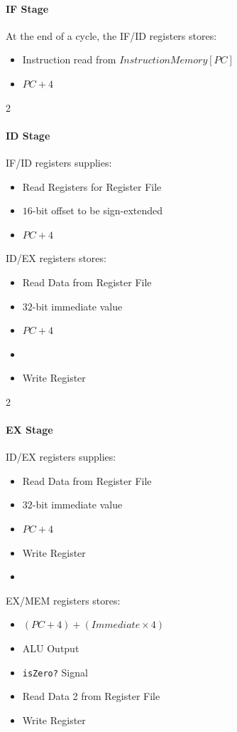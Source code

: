 \paragraph{IF Stage} At the end of a cycle, the IF/ID registers stores:
\begin{itemize}
  \item Instruction read from $InstructionMemory[PC]$
  \item $PC+4$
\end{itemize}

\begin{multicols}{2}
\paragraph{ID Stage} IF/ID registers supplies:
\begin{itemize}
  \item Read Registers for Register File
  \item $16$-bit offset to be sign-extended
  \item $PC+4$
\end{itemize}
ID/EX registers stores:
\begin{itemize}
  \item Read Data from Register File
  \item $32$-bit immediate value
  \item $PC+4$
\end{itemize}
\begin{itemize}
  \item[\vspace{\fill}]
\end{itemize}
\begin{itemize}
  \item Write Register
\end{itemize}
\end{multicols}

\begin{multicols}{2}
\paragraph{EX Stage} ID/EX registers supplies:
\begin{itemize}
  \item Read Data from Register File
  \item $32$-bit immediate value
  \item $PC+4$
  \item Write Register
  \item[\vspace{\fill}]
\end{itemize}
\columnbreak%
EX/MEM registers stores:
\begin{itemize}
  \item $\left( PC+4 \right) + \left( Immediate \times 4 \right) $
  \item ALU Output
  \item \verb|isZero?| Signal
  \item Read Data 2 from Register File
  \item Write Register
\end{itemize}
\end{multicols}

